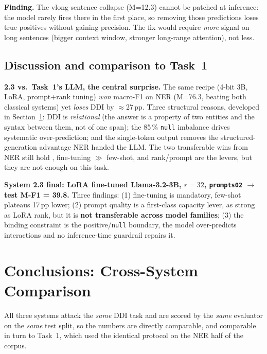 \documentclass[a4paper,11pt]{article}
\begin{document}
\textbf{Finding.} The vlong-sentence collapse (M=12.3) cannot be patched
at inference: the model rarely fires there in the first place, so
removing those predictions loses true positives without gaining
precision. The fix would require \emph{more} signal on long sentences
(bigger context window, stronger long-range attention), not less.

\subsection{Discussion and comparison to Task~1}
\begin{cmpbox}\small
\textbf{2.3 vs.\ Task~1's LLM, the central surprise.} The same recipe
(4-bit 3B, LoRA, prompt+rank tuning) \emph{won} macro-F1 on NER
(M=76.3, beating both classical systems) yet \emph{loses} DDI by
$\approx$27\,pp. Three structural reasons, developed in
Section~\ref{sec:conclusions}: DDI is \emph{relational} (the answer is a
property of two entities and the syntax between them, not of one span);
the 85\,\% \texttt{null} imbalance drives systematic over-prediction;
and the single-token output removes the structured-generation advantage
NER handed the LLM. The two transferable wins from NER still hold ,
fine-tuning $\gg$ few-shot, and rank/prompt are the levers, but they
are not enough on this task.
\end{cmpbox}

\begin{okbox}
\textbf{System 2.3 final: LoRA fine-tuned Llama-3.2-3B, $r{=}32$,
\texttt{prompts02} $\to$ test M-F1 = 39.8.} Three findings: (1)
fine-tuning is mandatory, few-shot plateaus 17\,pp lower; (2) prompt
quality is a first-class capacity lever, as strong as LoRA rank, but it
is \textbf{not transferable across model families}; (3) the binding
constraint is the positive/\texttt{null} boundary, the model
over-predicts interactions and no inference-time guardrail repairs it.
\end{okbox}

\section{Conclusions: Cross-System Comparison}\label{sec:conclusions}

All three systems attack the \emph{same} DDI task and are scored by the
\emph{same} evaluator on the \emph{same} test split, so the numbers are
directly comparable, and comparable in turn to Task~1, which used the
identical protocol on the NER half of the corpus.
\end{document}
